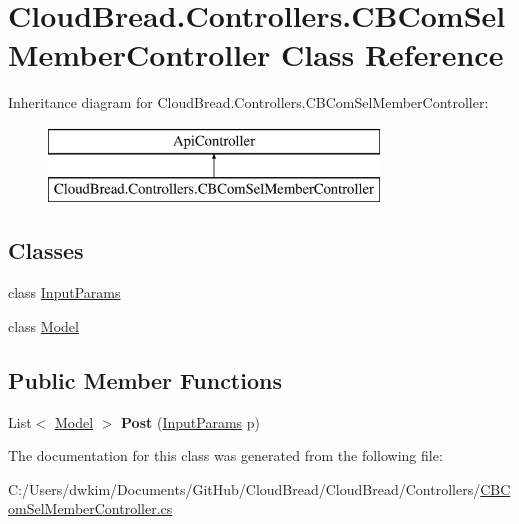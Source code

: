 \hypertarget{class_cloud_bread_1_1_controllers_1_1_c_b_com_sel_member_controller}{}\section{Cloud\+Bread.\+Controllers.\+C\+B\+Com\+Sel\+Member\+Controller Class Reference}
\label{class_cloud_bread_1_1_controllers_1_1_c_b_com_sel_member_controller}
Inheritance diagram for Cloud\+Bread.\+Controllers.\+C\+B\+Com\+Sel\+Member\+Controller\+:\begin{figure}[H]
\begin{center}
\leavevmode
\includegraphics[height=2.000000cm]{class_cloud_bread_1_1_controllers_1_1_c_b_com_sel_member_controller}
\end{center}
\end{figure}
\subsection*{Classes}
\begin{DoxyCompactItemize}
\item 
class \hyperlink{class_cloud_bread_1_1_controllers_1_1_c_b_com_sel_member_controller_1_1_input_params}{Input\+Params}
\item 
class \hyperlink{class_cloud_bread_1_1_controllers_1_1_c_b_com_sel_member_controller_1_1_model}{Model}
\end{DoxyCompactItemize}
\subsection*{Public Member Functions}
\begin{DoxyCompactItemize}
\item 
List$<$ \hyperlink{class_cloud_bread_1_1_controllers_1_1_c_b_com_sel_member_controller_1_1_model}{Model} $>$ {\bfseries Post} (\hyperlink{class_cloud_bread_1_1_controllers_1_1_c_b_com_sel_member_controller_1_1_input_params}{Input\+Params} p)\hypertarget{class_cloud_bread_1_1_controllers_1_1_c_b_com_sel_member_controller_a92ee184514d76c44b1a3cdffd4b0cb3e}{}\label{class_cloud_bread_1_1_controllers_1_1_c_b_com_sel_member_controller_a92ee184514d76c44b1a3cdffd4b0cb3e}

\end{DoxyCompactItemize}


The documentation for this class was generated from the following file\+:\begin{DoxyCompactItemize}
\item 
C\+:/\+Users/dwkim/\+Documents/\+Git\+Hub/\+Cloud\+Bread/\+Cloud\+Bread/\+Controllers/\hyperlink{_c_b_com_sel_member_controller_8cs}{C\+B\+Com\+Sel\+Member\+Controller.\+cs}\end{DoxyCompactItemize}
